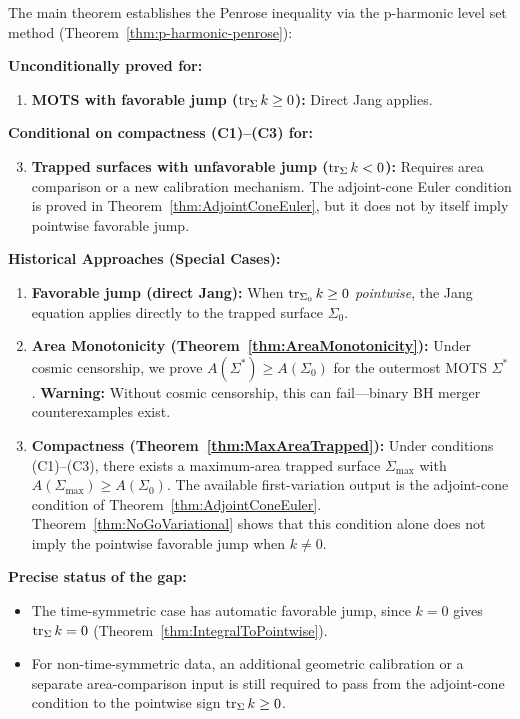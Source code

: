\begin{remark}\label{rem:WhyUnconditional}
The main theorem establishes the Penrose inequality via the p-harmonic level set method (Theorem~\ref{thm:p-harmonic-penrose}):

\textbf{Unconditionally proved for:}
\begin{enumerate}
    \item \textbf{MOTS with favorable jump ($\operatorname{tr}_\Sigma k \geq 0$):} Direct Jang applies.
\end{enumerate}

\textbf{Conditional on compactness (C1)--(C3) for:}
\begin{enumerate}
    \setcounter{enumi}{2}
    \item \textbf{Trapped surfaces with unfavorable jump ($\operatorname{tr}_\Sigma k < 0$):} Requires area comparison or a new calibration mechanism. The adjoint-cone Euler condition is proved in Theorem~\ref{thm:AdjointConeEuler}, but it does not by itself imply pointwise favorable jump.
\end{enumerate}

\textbf{Historical Approaches (Special Cases):}
\begin{enumerate}
    \item \textbf{Favorable jump (direct Jang):} When $\operatorname{tr}_{\Sigma_0} k \ge 0$ \emph{pointwise}, the Jang equation applies directly to the trapped surface $\Sigma_0$.
    \item \textbf{Area Monotonicity (Theorem~\ref{thm:AreaMonotonicity}):} Under cosmic censorship, we prove $A(\Sigma^*) \ge A(\Sigma_0)$ for the outermost MOTS $\Sigma^*$. \textbf{Warning:} Without cosmic censorship, this can fail---binary BH merger counterexamples exist.
    \item \textbf{Compactness (Theorem~\ref{thm:MaxAreaTrapped}):} Under conditions (C1)--(C3), there exists a maximum-area trapped surface $\Sigma_{\max}$ with $A(\Sigma_{\max}) \ge A(\Sigma_0)$. The available first-variation output is the adjoint-cone condition of Theorem~\ref{thm:AdjointConeEuler}. Theorem~\ref{thm:NoGoVariational} shows that this condition alone does not imply the pointwise favorable jump when $k\neq0$.
\end{enumerate}

\textbf{Precise status of the gap:}
\begin{itemize}
    \item The time-symmetric case has automatic favorable jump, since $k=0$ gives $\operatorname{tr}_\Sigma k=0$ (Theorem~\ref{thm:IntegralToPointwise}).
    \item For non-time-symmetric data, an additional geometric calibration or a separate area-comparison input is still required to pass from the adjoint-cone condition to the pointwise sign $\operatorname{tr}_\Sigma k\ge0$.
\end{itemize}
\end{remark}

